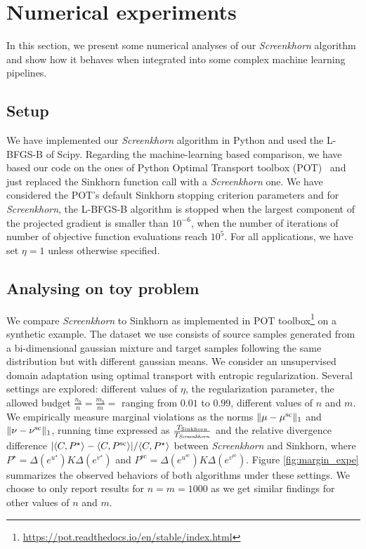
\section{Numerical experiments} %
\label{sec:numerical_experiments}

In this section, we present some numerical analyses of our
\emph{Screenkhorn} algorithm and show how it behaves when
integrated into some complex machine learning pipelines.

\subsection{Setup}

We have implemented our \emph{Screenkhorn} algorithm in Python and used the L-BFGS-B of
Scipy. Regarding the machine-learning based comparison, we have based our code
on the ones of Python Optimal Transport toolbox (POT)~\citep{flamary2017pot} and just replaced the Sinkhorn function call with a \emph{Screenkhorn} one. We have considered the POT's default Sinkhorn stopping criterion parameters and for \emph{Screenkhorn}, the L-BFGS-B algorithm is stopped when the 
largest component of the projected gradient is smaller than $10^{-6}$, when the number of iterations of number of objective function evaluations reach $10^{5}$. For all applications, we have set $\eta=1$ unless otherwise specified.

\subsection{Analysing on toy problem}

We compare \emph{Screenkhorn} to Sinkhorn as implemented in POT toolbox\footnote{\url{https://pot.readthedocs.io/en/stable/index.html}} on  a synthetic example. The dataset we use consists of source samples generated from a bi-dimensional gaussian mixture and target samples following the same distribution but with different gaussian means. We consider an unsupervised domain adaptation using optimal transport with entropic regularization.  Several settings are explored: different values of $\eta$, the regularization parameter, the allowed budget $\frac{n_b}{n} = \frac{m_b}{m} = $ ranging from $0.01$ to $0.99$, different values of $n$ and $m$.
 We empirically measure  marginal violations as the norms $\|{\mu} -{\mu}^{\text{sc}}\|_1$ and $\|{\nu} -{\nu}^{\text{sc}}\|_1$, running time expressed as $\frac{T_{\text{Sinkhorn}}}{T_{\text{\emph{Screenkhorn}}}}$ and the relative divergence difference $| \langle C, P^\star \rangle - \langle C, P^{\text{sc}} \rangle|/\langle C, P^\star \rangle$ between \emph{Screenkhorn} and Sinkhorn, where $P^\star = \Delta(e^{u^\star}) K \Delta(e^{v^\star})$ and $P^{\text{sc}} = \Delta(e^{u^{\text{sc}}}) K \Delta(e^{v^{\text{sc}}}).$
Figure \ref{fig:margin_expe} summarizes the observed behaviors of both algorithms under these settings. We choose to only report results for $n=m=1000$ as we get similar findings for other values of $n$ and $m$. 

